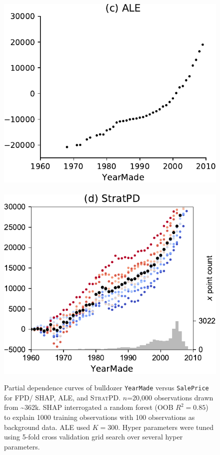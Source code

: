 \documentclass[]{article} %
\newcommand{\spd}{\fontfamily{cmr}\textsc{\small StratPD}}
\begin{document}
\begin{figure}[!htbp]
\begin{center}
\includegraphics[scale=0.35]{images/bulldozer_YearMade_ale.pdf}~~
\includegraphics[scale=0.35]{images/bulldozer_YearMade_stratpd.pdf}\vspace{-2mm}
\caption{\small Partial dependence curves of bulldozer {\tt YearMade} versus {\tt SalePrice} for FPD/ SHAP, ALE, and \spd. $n$=20,000 observations drawn from \textasciitilde{}362k. SHAP interrogated a random forest (OOB $R^2=0.85$) to explain 1000 training observations with 100 observations as background data.  ALE used $K=300$. Hyper parameters were tuned using 5-fold cross validation grid search over several hyper parameters.}
\label{fig:yearmade}
\end{center}
\end{figure}
\end{document}
